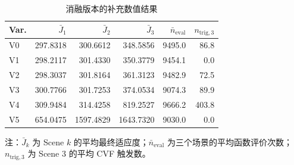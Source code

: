 \begin{table}[!t]
\centering
\caption{消融版本的补充数值结果}
\label{tab:ablation-key-metrics}
\scriptsize
\begin{tabular*}{\linewidth}{@{\extracolsep{\fill}}lrrrrr@{}}
\toprule
Var. & $\bar J_1$ & $\bar J_2$ & $\bar J_3$ &
$\bar n_{\mathrm{eval}}$ & $n_{\mathrm{trig},3}$ \\
\midrule
V0 & 297.8318 & 300.6612 & 348.5856 & 9495.0 & 86.8 \\
V1 & 298.2117 & 301.4330 & 350.3779 & 9454.1 & 0.0 \\
V2 & 298.3037 & 301.8164 & 361.3123 & 9482.9 & 72.5 \\
V3 & 300.7766 & 301.7253 & 374.0534 & 9074.3 & 89.9 \\
V4 & 309.9484 & 314.4258 & 819.2527 & 9666.2 & 403.8 \\
V5 & 654.0475 & 1597.4829 & 1643.7320 & 9030.0 & 0.0 \\
\bottomrule
\end{tabular*}
\parbox{\linewidth}{\scriptsize 注：$\bar J_k$ 为 Scene $k$ 的平均最终适应度；$\bar n_{\mathrm{eval}}$ 为三个场景的平均函数评价次数；$n_{\mathrm{trig},3}$ 为 Scene 3 的平均 CVF 触发数。}
\end{table}
